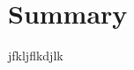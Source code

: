 \documentclass[
10pt, %
a4paper, %
oneside, %
headinclude,footinclude, %
BCOR5mm, %
]{scrartcl}
\title{\normalfont{Fluid Simulation on CUDA GPUs}}
\subtitle{Johns Hopkins University: EN.605.617.81.SP23 Introduction to GPU Programming }
\author{\spacedlowsmallcaps{Nate Lao (nlao1@jh.edu)}}
\date{May 7th 2023}
\begin{document}
\maketitle
\section{Summary}
jfkljflkdjlk
\end{document}
